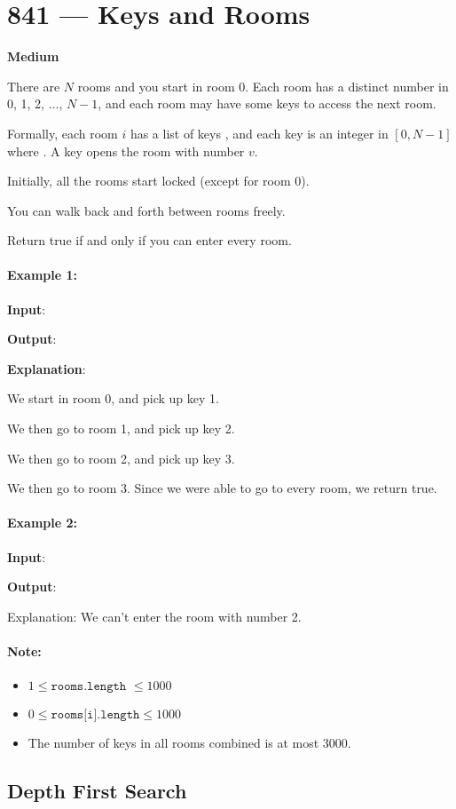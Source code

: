 \section{841 --- Keys and Rooms}

\textbf{Medium}

There are $ N $ rooms and you start in room 0.  Each room has a distinct number in 0, 1, 2, $\ldots$, $N-1$, and each room may have some keys to access the next room. 

Formally, each room $i$ has a list of keys , and each key  is an integer in $[0, N-1]$ where .  A key  opens the room with number $v$.

Initially, all the rooms start locked (except for room 0). 

You can walk back and forth between rooms freely.

Return true if and only if you can enter every room.

\paragraph{Example 1:}

\begin{flushleft}
\textbf{Input}: \fcj{[[1],[2],[3],[]]}

\textbf{Output}: 

\textbf{Explanation}:  

We start in room 0, and pick up key 1.

We then go to room 1, and pick up key 2.

We then go to room 2, and pick up key 3.

We then go to room 3.  Since we were able to go to every room, we return true.
\end{flushleft}

\paragraph{Example 2:}

\begin{flushleft}
\textbf{Input}: \fcj{[[1,3],[3,0,1],[2],[0]]}

\textbf{Output}: 

Explanation: We can't enter the room with number 2.
\end{flushleft}

\paragraph{Note:}

\begin{itemize}
\item $1 \leq \texttt{rooms.length } \leq 1000$
\item $0 \leq \texttt{rooms[i].length} \leq 1000$
\item The number of keys in all rooms combined is at most 3000.
\end{itemize}

\subsection{Depth First Search}